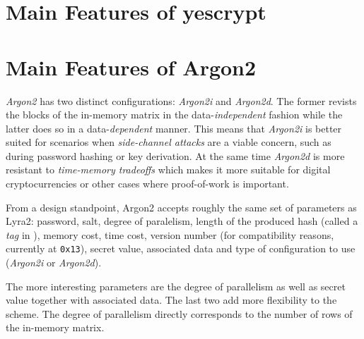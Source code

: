 \section{Main Features of yescrypt}

\section{Main Features of Argon2}

\emph{Argon2} has two distinct configurations: \emph{Argon2i} and \emph{Argon2d}. The former revists the blocks of the in-memory matrix in the data-\emph{independent} fashion while the latter does so in a data-\emph{dependent} manner. This means that \emph{Argon2i} is better suited for scenarios when \emph{side-channel attacks} are a viable concern, such as during password hashing or key derivation. At the same time \emph{Argon2d} is more resistant to \emph{time-memory tradeoffs} which makes it more suitable for digital cryptocurrencies or other cases where proof-of-work is important.

From a design standpoint, Argon2 accepts roughly the same set of parameters as Lyra2: password, salt, degree of paralelism, length of the produced hash (called a \emph{tag} in \cite{biryukov:2015:argon2}), memory cost, time cost, version number (for compatibility reasons, currently at \texttt{0x13}), secret value, associated data and type of configuration to use (\emph{Argon2i} or \emph{Argon2d}).

The more interesting parameters are the degree of parallelism as well as secret value together with associated data. The last two add more flexibility to the scheme. The degree of parallelism directly corresponds to the number of rows of the in-memory matrix.

